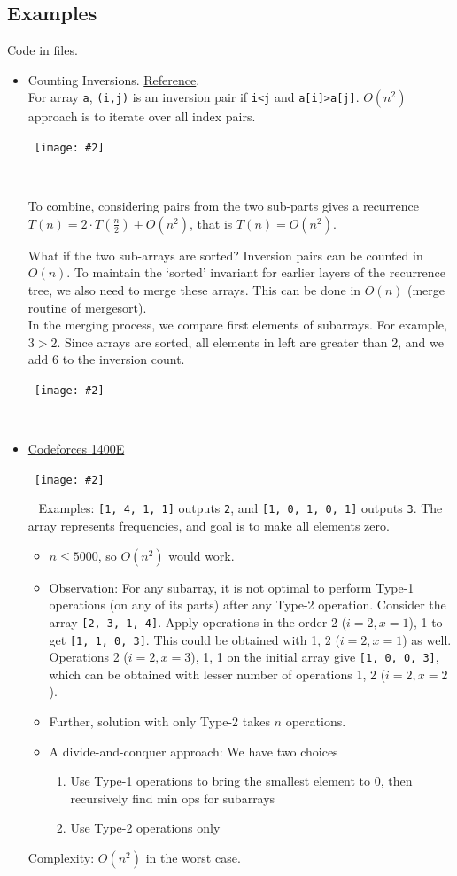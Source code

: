 \documentclass{article}
\newcommand{\T}[1]{\texttt{#1}}
\newcommand{\image}[2]{\
    \begin{center}\
        \texttt{[image: \#2]}\
    \end{center}\
}
\begin{document}
\begin{sloppypar}
    \subsection{Examples}
    Code in files.
    \begin{itemize}
        \item Counting Inversions. \href{https://homes.cs.washington.edu/~jrl/teaching/cse312au10/lec24.pdf}{Reference}.\\
        For array \T{a}, \T{(i,j)} is an inversion pair if \T{i<j} and \T{a[i]>a[j]}. $O(n^2)$ approach is to iterate over all index pairs.
        \image{0.8}{../images/inv-1.png}
        \noindent \par To combine, considering pairs from the two sub-parts gives a recurrence $T(n) = 2\cdot T(\frac{n}{2}) + O(n^2)$, that is $T(n) = O(n^2)$.
        \noindent \par What if the two sub-arrays are sorted? Inversion pairs can be counted in $O(n)$. To maintain the `sorted' invariant for earlier layers of the recurrence tree, we also need to merge these arrays. This can be done in $O(n)$ (merge routine of mergesort).\\
        In the merging process, we compare first elements of subarrays. For example, $3>2$. Since arrays are sorted, all elements in left are greater than $2$, and we add $6$ to the inversion count.
        \image{0.8}{../images/inv-2.png}
        \item \href{https://codeforces.com/problemset/problem/1400/E}{Codeforces 1400E}
        \image{0.95}{../images/cf-1400-e.png}
        Examples: \T{[1, 4, 1, 1]} outputs \T{2}, and \T{[1, 0, 1, 0, 1]} outputs \T{3}. The array represents frequencies, and goal is to make all elements zero.
        \begin{itemize}
            \item $n\le 5000$, so $O(n^2)$ would work.
            \item Observation: For any subarray, it is not optimal to perform Type-1 operations (on any of its parts) after any Type-2 operation. Consider the array \T{[2, 3, 1, 4]}. Apply operations in the order 2 ($i=2, x=1$), 1 to get \T{[1, 1, 0, 3]}. This could be obtained with 1, 2 ($i=2, x=1$) as well. Operations 2 ($i=2, x=3$), 1, 1 on the initial array give \T{[1, 0, 0, 3]}, which can be obtained with lesser number of operations 1, 2 ($i=2, x=2$).
            \item Further, solution with only Type-2 takes $n$ operations.
            \item A divide-and-conquer approach: We have two choices
            \begin{enumerate}
                \item Use Type-1 operations to bring the smallest element to 0, then recursively find min ops for subarrays
                \item Use Type-2 operations only
            \end{enumerate}
        \end{itemize}
        Complexity: $O(n^2)$ in the worst case.
    \end{itemize}


\end{sloppypar}
\end{document}
